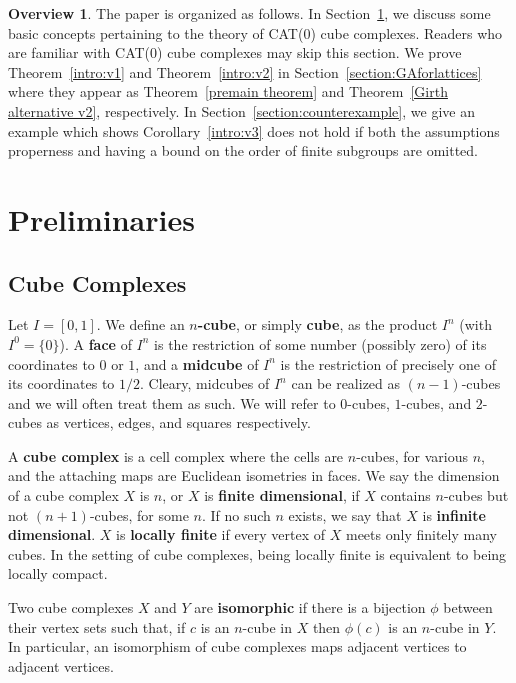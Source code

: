 \documentclass{amsart}
\theoremstyle{definition}
\newtheorem*{Notation warning}{Warning on notations}
\newtheorem*{Overview}{Overview}
\newtheorem*{Sketch of proof}{Sketch of proof for Theorem C}
\begin{document}
\begin{sloppypar}
\begin{Overview}The paper is organized as follows. In Section~\ref{section:preliminaries}, we discuss some basic concepts pertaining to the theory of CAT(0) cube complexes. Readers who are familiar with CAT(0) cube complexes may skip this section.  
We prove Theorem~\ref{intro:v1} and Theorem~\ref{intro:v2} in Section~\ref{section:GAforlattices} where they appear as Theorem~\ref{premain theorem} and Theorem~\ref{Girth alternative v2}, respectively.
In Section~\ref{section:counterexample}, we give an example which shows Corollary~\ref{intro:v3} does not hold if both the assumptions properness and having a bound on the order of finite subgroups are omitted.
\end{Overview}




\section{Preliminaries}\label{section:preliminaries} 

\subsection{Cube Complexes} 

Let $I=[0,1]$. We define an {\bf $n$-cube}, or simply {\bf cube}, as the product $I^n$ (with $I^0=\{0\}$). A {\bf face} of $I^n$ is the restriction of some number (possibly zero) of its coordinates to $0$ or $1$, and a {\bf midcube} of $I^n$ is the restriction of precisely one of its coordinates to $1/2$. Cleary, midcubes of $I^n$ can be realized as $(n-1)$-cubes and we will often treat them as such. We will refer to $0$-cubes, $1$-cubes, and $2$-cubes as vertices, edges, and squares respectively.
\medskip

A {\bf cube complex} is a cell complex where the cells are $n$-cubes, for various $n$, and the attaching maps are Euclidean isometries in faces. We say the dimension of a cube complex $X$ is $n$, or $X$ is {\bf finite dimensional}, if $X$ contains $n$-cubes but not $(n+1)$-cubes, for some $n$. If no such $n$ exists, we say that $X$ is {\bf infinite dimensional}. $X$ is {\bf locally finite} if every vertex of $X$ meets only finitely many cubes. In the setting of cube complexes, being locally finite is equivalent to being locally compact.
\medskip

Two cube complexes $X$ and $Y$ are {\bf isomorphic} if there is a bijection $\phi$ between their vertex sets such that, if $c$ is an $n$-cube in $X$ then $\phi(c)$ is an $n$-cube in $Y$. In particular, an isomorphism of cube complexes maps adjacent vertices to adjacent vertices. 
\medskip


\end{sloppypar}
\end{document}
